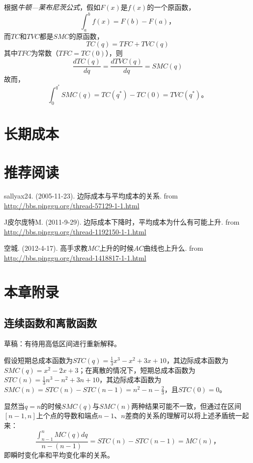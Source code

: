 根据\emph{牛顿—莱布尼茨公式}，假如$F(x)$是$f(x)$的一个原函数，
\[
\int_a^b f(x) = F(b) - F(a)\text{，}
\]
而$TC$和$TVC$都是$SMC$的原函数，
\[
TC(q)=TFC+TVC(q)
\]
其中$TFC$为常数（$TFC=TC(0)$），则
\[
\frac{{dTC(q)}}{{dq}} = \frac{{dTVC(q)}}{{dq}} = SMC(q)
\]
故而，
\[
\int_0^{{q^ * }} SMC(q) = TC({q^*}) - TC(0) = TVC({q^*})\text{。}
\]


\section{长期成本}

\section*{推荐阅读}
\begin{asparaenum}
\item sallyax24. (2005-11-23). 边际成本与平均成本的关系. from \url{http://bbs.pinggu.org/thread-57129-1-1.html}
\item J皮尔庞特M. (2011-9-29). 边际成本下降时，平均成本为什么有可能上升. from \url{http://bbs.pinggu.org/thread-1192150-1-1.html}
\item 空城. (2012-4-17). 高手求教$MC$上升的时候$AC$曲线也上升么. from \url{http://bbs.pinggu.org/thread-1418817-1-1.html}
\end{asparaenum}

\newpage
\section*{本章附录}

\subsection*{连续函数和离散函数}
\label{sec:lianxu-lisan-hanshu-guanxi}
草稿：有待用高低区间进行重新解释。

假设短期总成本函数为$STC(q)=\frac{1}{3} x^3 - x^2 + 3x + 10$，其边际成本函数为$SMC(q) = x^2 - 2x + 3$；在离散的情况下，短期总成本函数为$STC(n)=\frac{1}{3}n^3-n^2+3n+10$，其边际成本函数为$SMC(n) = STC(n) - STC(n-1)=n^2 - n -\frac{2}{3}$，且$STC(0)=0$。

显然当$q=n$的时候$SMC(q)$与$SMC(n)$两种结果可能不一致，但通过在区间$[n-1,n]$上个点的导数和端点$n-1$、$n$差商的关系的理解可以将上述矛盾统一起来：
\[
\frac{{\int_{n-1}^n {MC(q)dq} }}{{n - (n-1)}} = STC(n) - STC(n - 1) = MC(n)\text{，}
\]
即瞬时变化率和平均变化率的关系。

